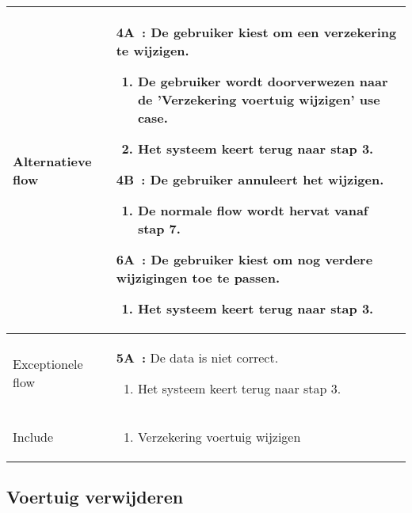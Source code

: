 \documentclass{article}
\begin{document}
\begin{tabularx}{\textwidth}{ | l | X |}
 Alternatieve flow & 
    \textbf{4A~:} De gebruiker kiest om een verzekering te wijzigen.
 	\begin{enumerate}[label=\alph*]
 		\item De gebruiker wordt doorverwezen naar de 'Verzekering voertuig wijzigen' use case.
        \item Het systeem keert terug naar stap 3.
 	\end{enumerate}
    \textbf{4B~:} De gebruiker annuleert het wijzigen.
 	\begin{enumerate}[label=\alph*]
 		\item De normale flow wordt hervat vanaf stap 7.
 	\end{enumerate}
    \textbf{6A~:} De gebruiker kiest om nog verdere wijzigingen toe te passen.
 	\begin{enumerate}[label=\alph*]
 		\item Het systeem keert terug naar stap 3.
 	\end{enumerate}
 \\ 
 \hline
 
 Exceptionele flow &
 	\textbf{5A~:} De data is niet correct. %
 	\begin{enumerate}[label=\alph*]
 		\item Het systeem keert terug naar stap 3.
 	\end{enumerate}
 
 \\
 \hline
 
 Include & 
 
 \begin{enumerate}
 	\item Verzekering voertuig wijzigen
 \end{enumerate}\\ 
 \hline
 
 
\end{tabularx}

\newpage
\subsection{Voertuig verwijderen}
\end{document}
